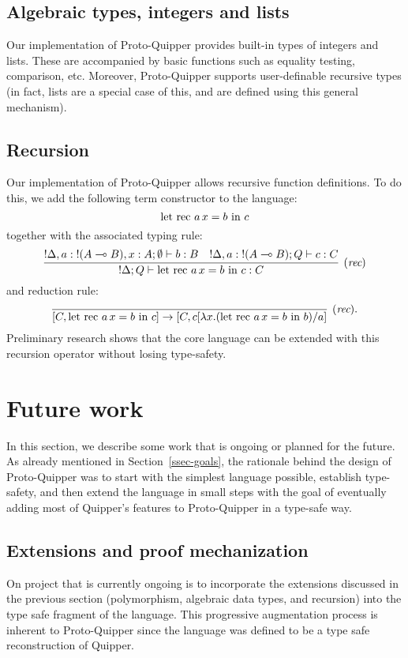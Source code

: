 \documentclass[twoside]{article}
\begin{document}
\subsection{Algebraic types, integers and lists}

Our implementation of Proto-Quipper provides built-in types of
integers and lists. These are accompanied by basic functions such as
equality testing, comparison, etc. Moreover, Proto-Quipper supports
user-definable recursive types (in fact, lists are a special case of
this, and are defined using this general mechanism).

\subsection{Recursion}

Our implementation of Proto-Quipper allows recursive function
definitions. To do this, we add the following term constructor to the
language:
\[
\textrm{\rm let rec}~ a\,x = b ~\textrm{\rm in}~ c
\]    
together with the associated typing rule:
\[
\infer[(\rul{rec})]{{!}\Delta;Q \entails \letrecin{a\,x}{b}{c}:C}{
  {!}\Delta,a:{!}(A\loli B), x:A;\emptyset \entails b:B
  &
  {!}\Delta, a:{!}(A\loli B) ;Q \entails c:C      
}
\]
and reduction rule:
\[
\infer[(\rul{rec}).]{[C,\letrecin{a\,x}{b}{c}]\to [C, c[\lambda x.(\letrecin{a\,x}{b}{b})/a]}{}
\]
Preliminary research shows that the core language can be extended 
with this recursion operator without losing type-safety. 

\clearpage
\section{Future work}\label{sec-future}

In this section, we describe some work that is ongoing or planned for
the future. As already mentioned in Section~\ref{ssec-goals}, the
rationale behind the design of Proto-Quipper was to start with the
simplest language possible, establish type-safety, and then extend the
language in small steps with the goal of eventually adding most of
Quipper's features to Proto-Quipper in a type-safe way. 

\subsection{Extensions and proof mechanization}

On project that is currently ongoing is to incorporate the extensions
discussed in the previous section (polymorphism, algebraic data types,
and recursion) into the type safe fragment of the language. This
progressive augmentation process is inherent to Proto-Quipper since
the language was defined to be a type safe reconstruction of
Quipper. 
\end{document}
